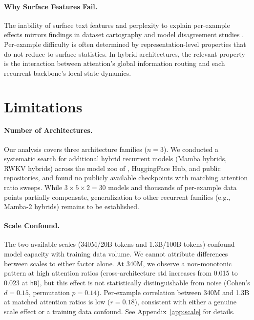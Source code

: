 \documentclass[11pt,a4paper]{article}
\begin{document}
\paragraph{Why Surface Features Fail.}
The inability of surface text features and perplexity to explain per-example effects mirrors findings in dataset cartography \citep{swayamdipta2020dataset} and model disagreement studies \citep{fort2019stiffness}. Per-example difficulty is often determined by representation-level properties that do not reduce to surface statistics. In hybrid architectures, the relevant property is the interaction between attention's global information routing and each recurrent backbone's local state dynamics.

\section{Limitations}

\paragraph{Number of Architectures.}
Our analysis covers three architecture families ($n = 3$). We conducted a systematic search for additional hybrid recurrent models (Mamba hybrids, RWKV hybrids) across the model zoo of \citet{wang2025mamba}, HuggingFace Hub, and public repositories, and found no publicly available checkpoints with matching attention ratio sweeps. While $3 \times 5 \times 2 = 30$ models and thousands of per-example data points partially compensate, generalization to other recurrent families (e.g., Mamba-2 hybrids) remains to be established.

\paragraph{Scale Confound.}
The two available scales (340M/20B tokens and 1.3B/100B tokens) confound model capacity with training data volume. We cannot attribute differences between scales to either factor alone. At 340M, we observe a non-monotonic pattern at high attention ratios (cross-architecture std increases from 0.015 to 0.023 at \texttt{h8}), but this effect is not statistically distinguishable from noise (Cohen's $d = 0.15$, permutation $p = 0.14$). Per-example correlation between 340M and 1.3B at matched attention ratios is low ($r = 0.18$), consistent with either a genuine scale effect or a training data confound. See Appendix~\ref{app:scale} for details.
\end{document}
